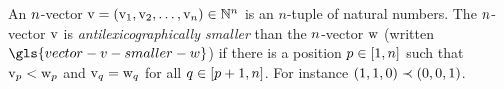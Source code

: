 
An $n$-vector $\mathrm{v} = (\mathrm{v}_{1}, \mathrm{v}_{2}, \dots, \mathrm{v}_{n}) \in
\mathbb{N}^{n}$ is an $n$-tuple of natural numbers.
The $n$-vector $\mathrm{v}$ is \emph{antilexicographically smaller}
than the $n$-vector $\mathrm{w}$ (written $\gls{vector-v-smaller-w}$) if there is
a position $p \in [1, n]$ such that $\mathrm{v}_{p} < \mathrm{w}_{p}$ and
$\mathrm{v}_{q} = \mathrm{w}_{q}$ for all $q \in [p+1, n]$.
For instance $(1,1,0)\prec(0,0,1)$.

